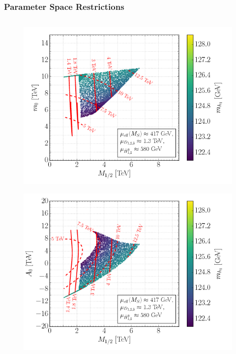 \documentclass[10pt,aspectratio=169]{beamer}
\begin{document}
\begin{frame}
  \frametitle{Parameter Space Restrictions}
  \begin{columns}[t]
    \begin{column}{0.3\textwidth}
      \vspace{-37pt}
      \begin{figure}
        \includegraphics[width=1.1\textwidth]{cse6ssm_mupos400GeV_m12m0_Mhh}
      \end{figure}
      \vspace{-30pt}
      \begin{figure}
        \includegraphics[width=1.1\textwidth]{cse6ssm_mupos400GeV_m12A0_Mhh}
      \end{figure}

\end{column}
\end{columns}
\end{frame}
\end{document}
